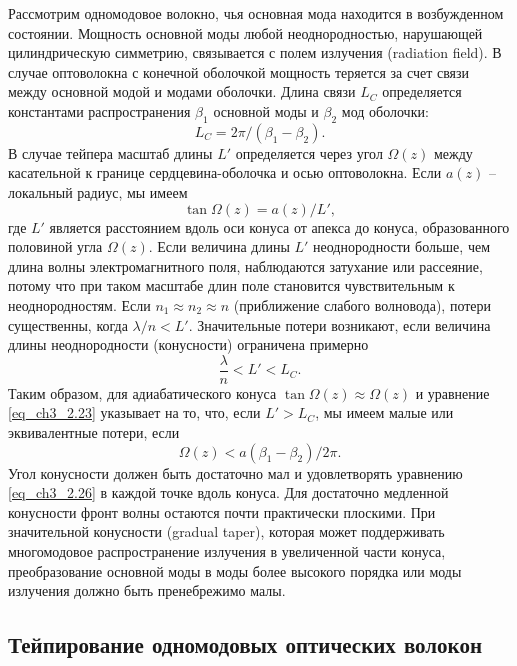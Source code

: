 Рассмотрим одномодовое волокно, чья основная мода находится в возбужденном состоянии. Мощность основной моды любой неоднородностью, нарушающей цилиндрическую симметрию, связывается с полем излучения (radiation field). В случае оптоволокна с конечной оболочкой мощность теряется за счет связи между основной модой и модами оболочки. Длина связи $L_C$ определяется константами распространения $\beta_1$ основной моды и $\beta_2$ мод оболочки:
\begin{equation}\label{eq_ch3_2.23}
  L_C=2\pi/(\beta_1-\beta_2).
\end{equation}
В случае тейпера масштаб длины $L'$ определяется через угол $\Omega(z)$ между касательной к границе сердцевина-оболочка и осью оптоволокна. Если $a(z)$ -- локальный радиус, мы имеем
\begin{equation}\label{eq_ch3_2.24}
  \tan\Omega(z)=a(z)/L',
\end{equation}
где $L'$ является расстоянием вдоль оси конуса от апекса до конуса, образованного половиной угла $\Omega(z)$. Если величина длины $L'$ неоднородности больше, чем длина волны электромагнитного поля, наблюдаются затухание или рассеяние, потому что при таком масштабе длин поле становится чувствительным к неоднородностям. Если  $n_1 \approx n_2 \approx n$ (приближение слабого волновода), потери существенны, когда $\lambda/n < L'$. Значительные потери возникают, если величина длины неоднородности (конусности) ограничена примерно
\begin{equation}\label{eq_ch3_2.25}
  \frac{\lambda}{n} < L' < L_C.
\end{equation}
Таким образом, для адиабатического конуса $\tan\Omega(z) \approx \Omega(z)$ и уравнение \eqref{eq_ch3_2.23} указывает на то, что, если $L'>L_C$, мы имеем малые или эквивалентные потери, если
\begin{equation}\label{eq_ch3_2.26}
  \Omega(z)<a(\beta_1-\beta_2)/2\pi.
\end{equation}
Угол конусности должен быть достаточно мал и удовлетворять уравнению \eqref{eq_ch3_2.26} в каждой точке вдоль конуса. Для достаточно медленной конусности фронт волны остаются почти практически плоскими. При значительной конусности (gradual taper), которая может поддерживать многомодовое распространение излучения в увеличенной части конуса, преобразование основной моды в моды более высокого порядка или моды излучения должно быть пренебрежимо малы.

\subsection{Тейпирование одномодовых оптических волокон}

